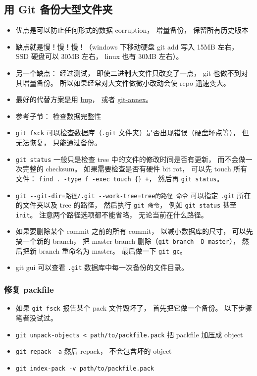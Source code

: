 \subsection{用 Git 备份大型文件夹}
\begin{itemize}
\item 优点是可以防止任何形式的数据 corruption， 增量备份， 保留所有历史版本
\item 缺点就是慢！慢！慢！（windows 下移动硬盘 git add 写入 15MB 左右， SSD 硬盘可以 30MB 左右， linux 也有 30MB 左右）。
\item 另一个缺点： 经过测试， 即使二进制大文件只改变了一点， git 也做不到对其增量备份。 所以如果经常对大文件做微小改动会使 repo 迅速变大。
\item 最好的代替方案是用 \href{https://bup.github.io/}{bup}， 或者 \href{https://git-annex.branchable.com/}{git-annex}。
\item 参考子节： 检查数据完整性
\item \verb|git fsck| 可以检查数据库（\verb|.git| 文件夹）是否出现错误（硬盘坏点等）， 但无法恢复， 只能通过备份。
\item \verb|git status| 一般只是检查 tree 中的文件的修改时间是否有更新， 而不会做一次完整的 checksum。 如果需要检查是否有硬件 bit rot， 可以先 touch 所有文件： \verb|find . -type f -exec touch {} +|， 然后再 \verb|git status|。
\item \verb|git --git-dir=路径/.git --work-tree=tree的路径 命令| 可以指定 \verb|.git| 所在的文件夹以及 tree 的路径， 然后执行 \verb|git 命令|， 例如 \verb|git status| 甚至 \verb|init|。 注意两个路径选项都不能省略， 无论当前在什么路径。
\item 如果要删除某个 commit 之前的所有 commit， 以减小数据库的尺寸， 可以先搞一个新的 branch， 把 master branch 删除（\verb|git branch -D master|）， 然后把新 branch 重命名为 master。 最后做一下 \verb|git gc|。
\item git gui 可以查看 \verb|.git| 数据库中每一次备份的文件目录。
\end{itemize}

\subsubsection{修复 packfile}
\begin{itemize}
\item 如果 \verb|git fsck| 报告某个 pack 文件毁坏了， 首先把它做一个备份。 以下步骤笔者没试过。
\item \verb|git unpack-objects < path/to/packfile.pack| 把 packfile 加压成 object
\item \verb|git repack -a| 然后 repack， 不会包含坏的 object
\item \verb|git index-pack -v path/to/packfile.pack| 
\end{itemize}



